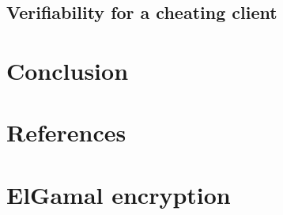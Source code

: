 \documentclass[12pt,a4paper]{article}
\theoremstyle{definition}
\begin{document}
\subsection{Verifiability for a cheating client}
\section{Conclusion}
\newpage
\section{References}


\newpage
\appendix
\section{ElGamal encryption}\label{app-elgamal}
\end{document}
